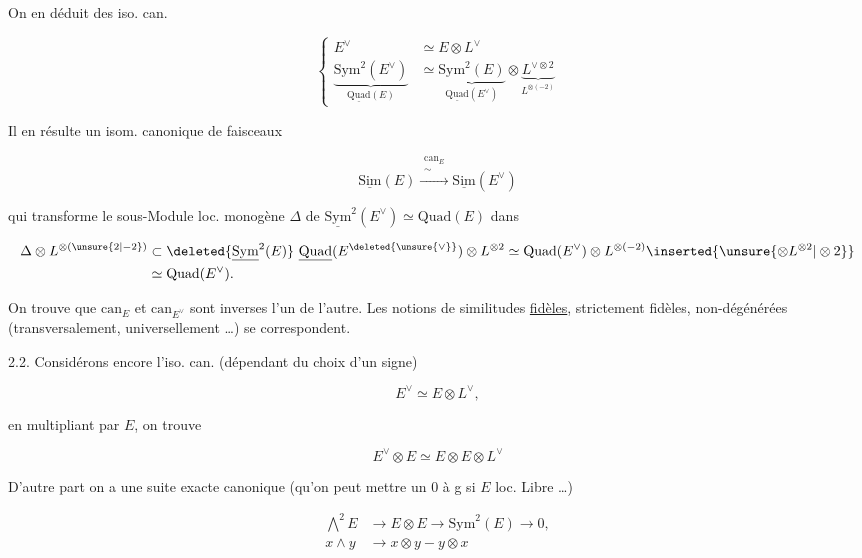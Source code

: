 
On en déduit des iso. can.

\[
\left\{\begin{aligned}
E^\vee&\simeq E\otimes L^\vee\\
\underbrace{\mathrm{Sym}^2(E^\vee)}_{\underline{\mathrm{Quad}}(E)}
&\simeq\underbrace{\mathrm{Sym}^2(E)}_{\underline{\mathrm{Quad}}(E^\vee)}\otimes
\underbrace{L^{\vee\otimes2}}_{L^{\otimes(-2)}}
\end{aligned}\right.
\]


Il en résulte un isom. canonique de faisceaux

\[\underline{\mathrm{Sim}}(E)\xrightarrow{\substack{\mathrm{can}_E\\\sim}}\underline{\mathrm{Sim}}(E^\vee)\]

qui transforme le sous-Module loc. monogène $\Delta$ de $\underline{\mathrm{Sym}}^2(E^\vee)\simeq\mathrm{Quad}(E)$ dans

\[
\begin{aligned}
\Delta\otimes L^{\otimes(\unsure{2|-2})}&\subset
\deleted{\underline{\mathrm{Sym}}^2(E)}\ \underline{\mathrm{Quad}}(E^{\deleted{\unsure{\vee}}})\otimes L^{\otimes2}
\simeq \mathrm{Quad}(E^\vee)\otimes L^{\otimes(-2)}\inserted{\unsure{\otimes L^{\otimes2}|\otimes2}}\\
&\simeq\mathrm{Quad}(E^\vee).
\end{aligned}
\]

On trouve que $\mathrm{can}_E$ et $\mathrm{can}_{E^\vee}$ sont inverses l'un de l'autre. Les notions de  similitudes \uline{fidèles}, strictement fidèles, non-dégénérées (transversalement, universellement \ldots)  se correspondent.

2.2. Considérons encore l'iso. can. (dépendant du choix d'un signe)

\[E^\vee\simeq E\otimes L^\vee,\]

en \inserted{$\otimes$-}multipliant  par $E$, on trouve

\[E^\vee\otimes E\simeq E\otimes E\otimes L^\vee\]

D'autre part on a   une suite exacte canonique (qu'on peut mettre un $0$ à g si $E$ loc. Libre \ldots)

\[
\begin{aligned}
\bigwedge^2 E&\longrightarrow E\otimes E\longrightarrow\mathrm{Sym}^2(E)\longrightarrow0,\\
x\wedge y&\longrightarrow x\otimes y-y\otimes x
\end{aligned}
\]
